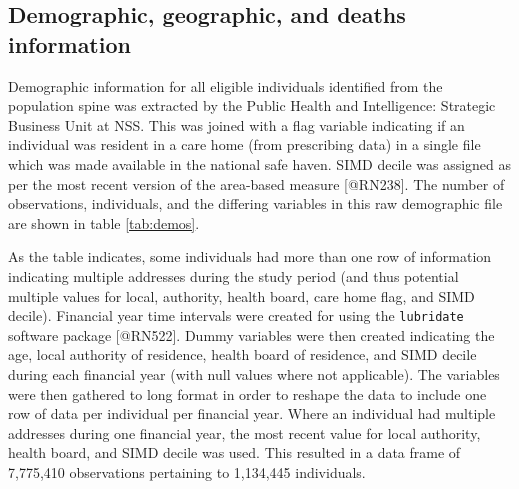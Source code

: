 \documentclass[]{article}
\begin{document}
\FloatBarrier

\subsection{Demographic, geographic, and deaths information}\label{subsubsec:nrs-summs}

Demographic information for all eligible individuals identified from the
population spine was extracted by the Public Health and Intelligence:
Strategic Business Unit at NSS. This was joined with a flag variable
indicating if an individual was resident in a care home (from
prescribing data) in a single file which was made available in the
national safe haven. SIMD decile was assigned as per the most recent
version of the area-based measure {[}@RN238{]}. The number of
observations, individuals, and the differing variables in this raw
demographic file are shown in table \ref{tab:demos}.

\begin{table}[h]
\centering
\caption{Demographic file data}
\label{tab:demos}
\end{table}

As the table indicates, some individuals had more than one row of
information indicating multiple addresses during the study period (and
thus potential multiple values for local, authority, health board, care
home flag, and SIMD decile). Financial year time intervals were created
for using the \texttt{lubridate} software package {[}@RN522{]}. Dummy
variables were then created indicating the age, local authority of
residence, health board of residence, and SIMD decile during each
financial year (with null values where not applicable). The variables
were then gathered to long format in order to reshape the data to
include one row of data per individual per financial year. Where an
individual had multiple addresses during one financial year, the most
recent value for local authority, health board, and SIMD decile was
used. This resulted in a data frame of 7,775,410 observations pertaining
to 1,134,445 individuals.
\end{document}
